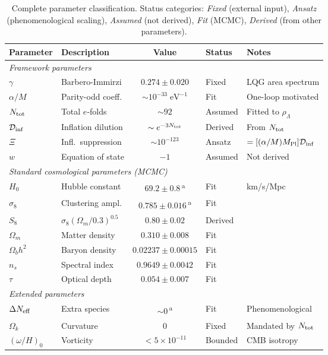 \documentclass[aps,prd,twocolumn,superscriptaddress,showpacs,preprintnumbers,
  nofootinbib,longbibliography,floatfix]{revtex4-2}
\newcommand{\Dinf}{\mathcal{D}_{\rm inf}}
\newcommand{\MPl}{M_{\rm Pl}}
\newcommand{\Neff}{N_{\rm eff}}
\newcommand{\BI}{\gamma}
\begin{document}
\begin{table}[t]
\caption{\label{tab:params} Complete parameter classification. Status
categories: \textit{Fixed} (external input), \textit{Ansatz}
(phenomenological scaling), \textit{Assumed} (not derived),
\textit{Fit} (MCMC), \textit{Derived} (from other parameters).}
\begin{ruledtabular}
\begin{tabular}{llcll}
\textbf{Parameter} & \textbf{Description} & \textbf{Value}
  & \textbf{Status} & \textbf{Notes} \\
\hline
\multicolumn{5}{l}{\textit{Framework parameters}} \\
$\BI$ & Barbero-Immirzi & $0.274 \pm 0.020$ & Fixed & LQG area spectrum \\
$\alpha/M$ & Parity-odd coeff. & $\sim 10^{-33}\;\text{eV}^{-1}$
  & Fit & One-loop motivated \\
$N_{\rm tot}$ & Total $e$-folds & $\sim 92$ & Assumed
  & Fitted to $\rho_\Lambda$ \\
$\Dinf$ & Inflation dilution & $\sim e^{-3N_{\rm tot}}$
  & Derived & From $N_{\rm tot}$ \\
$\Xi$ & Infl.\ suppression & $\sim 10^{-123}$
  & Ansatz & $=[(\alpha/M)\MPl]\Dinf$ \\
$w$ & Equation of state & $-1$ & Assumed & Not derived \\
\hline
\multicolumn{5}{l}{\textit{Standard cosmological parameters (MCMC)}} \\
$H_0$ & Hubble constant & $69.2\pm 0.8$\,\textsuperscript{a}
  & Fit & km/s/Mpc \\
$\sigma_8$ & Clustering ampl. & $0.785\pm 0.016$\,\textsuperscript{a}
  & Fit & \\
$S_8$ & $\sigma_8(\Omega_m/0.3)^{0.5}$ & $0.80\pm 0.02$
  & Derived & \\
$\Omega_m$ & Matter density & $0.310 \pm 0.008$ & Fit & \\
$\Omega_b h^2$ & Baryon density & $0.02237 \pm 0.00015$ & Fit & \\
$n_s$ & Spectral index & $0.9649 \pm 0.0042$ & Fit & \\
$\tau$ & Optical depth & $0.054 \pm 0.007$ & Fit & \\
\hline
\multicolumn{5}{l}{\textit{Extended parameters}} \\
$\Delta\Neff$ & Extra species & $\sim 0$\,\textsuperscript{a}
  & Fit & Phenomenological \\
$\Omega_k$ & Curvature & 0 & Fixed & Mandated by $N_{\rm tot}$ \\
$(\omega/H)_0$ & Vorticity & $< 5\times 10^{-11}$
  & Bounded & CMB isotropy \\
\end{tabular}
\end{ruledtabular}
\end{table}
\end{document}
